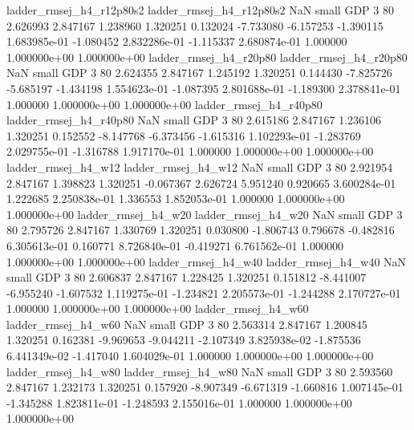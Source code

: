ladder_rmsej_h4_r12p80s2 ladder_rmsej_h4_r12p80s2                   NaN      small      GDP                 3 80 2.626993       2.847167 1.238960       1.320251    0.132024     -7.733080     -6.157253    -1.390115   1.683985e-01 -1.080452 2.832286e-01    -1.115337   2.680874e-01            1.000000    1.000000e+00        1.000000e+00
  ladder_rmsej_h4_r20p80   ladder_rmsej_h4_r20p80                   NaN      small      GDP                 3 80 2.624355       2.847167 1.245192       1.320251    0.144430     -7.825726     -5.685197    -1.434198   1.554623e-01 -1.087395 2.801688e-01    -1.189300   2.378841e-01            1.000000    1.000000e+00        1.000000e+00
  ladder_rmsej_h4_r40p80   ladder_rmsej_h4_r40p80                   NaN      small      GDP                 3 80 2.615186       2.847167 1.236106       1.320251    0.152552     -8.147768     -6.373456    -1.615316   1.102293e-01 -1.283769 2.029755e-01    -1.316788   1.917170e-01            1.000000    1.000000e+00        1.000000e+00
     ladder_rmsej_h4_w12      ladder_rmsej_h4_w12                   NaN      small      GDP                 3 80 2.921954       2.847167 1.398823       1.320251   -0.067367      2.626724      5.951240     0.920665   3.600284e-01  1.222685 2.250838e-01     1.336553   1.852053e-01            1.000000    1.000000e+00        1.000000e+00
     ladder_rmsej_h4_w20      ladder_rmsej_h4_w20                   NaN      small      GDP                 3 80 2.795726       2.847167 1.330769       1.320251    0.030800     -1.806743      0.796678    -0.482816   6.305613e-01  0.160771 8.726840e-01    -0.419271   6.761562e-01            1.000000    1.000000e+00        1.000000e+00
     ladder_rmsej_h4_w40      ladder_rmsej_h4_w40                   NaN      small      GDP                 3 80 2.606837       2.847167 1.228425       1.320251    0.151812     -8.441007     -6.955240    -1.607532   1.119275e-01 -1.234821 2.205573e-01    -1.244288   2.170727e-01            1.000000    1.000000e+00        1.000000e+00
     ladder_rmsej_h4_w60      ladder_rmsej_h4_w60                   NaN      small      GDP                 3 80 2.563314       2.847167 1.200845       1.320251    0.162381     -9.969653     -9.044211    -2.107349   3.825938e-02 -1.875536 6.441349e-02    -1.417040   1.604029e-01            1.000000    1.000000e+00        1.000000e+00
     ladder_rmsej_h4_w80      ladder_rmsej_h4_w80                   NaN      small      GDP                 3 80 2.593560       2.847167 1.232173       1.320251    0.157920     -8.907349     -6.671319    -1.660816   1.007145e-01 -1.345288 1.823811e-01    -1.248593   2.155016e-01            1.000000    1.000000e+00        1.000000e+00
